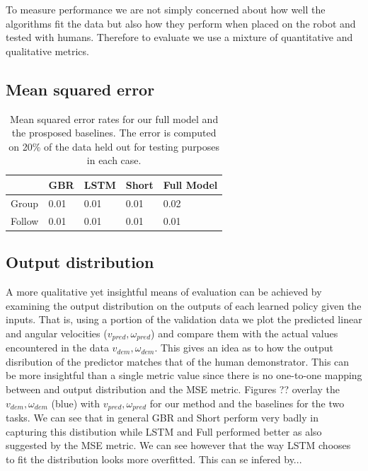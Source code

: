 \documentclass[letterpaper, 10 pt, conference]{ieeeconf}
\begin{document}
To measure performance we are not simply concerned about how well the algorithms fit the data but also how they perform when placed on the robot and tested with humans. Therefore to evaluate we use a mixture of quantitative and qualitative metrics. 

\subsection{Mean squared error}

\begin{table}[]
\centering
\caption{Mean squared error rates for our full model and the prosposed baselines. The error is computed on 20\% of the data held out for testing purposes in each case.} \label{tab:}
\label{my-label}
\begin{tabular}{|l|l|l|l|l|}
\hline
       & GBR  & LSTM & Short & Full Model \\ \hline
Group  & 0.01 & 0.01 & 0.01  & 0.02       \\ \hline
Follow & 0.01 & 0.01 & 0.01  & 0.01       \\ \hline
\end{tabular}

\end{table}



\subsection{Output distribution}
A more qualitative yet insightful means of evaluation can be achieved by examining the output distribution on the outputs of each learned policy given the inputs. That is, using a portion of the validation data we plot the predicted linear and angular velocities ($v_{pred},\omega_{pred}$) and compare them with the actual values encountered in the data $v_{dem},\omega_{dem}$. This gives an idea as to how the output disribution of the predictor matches that of the human demonstrator. This can be more insightful than a single metric value since there is no one-to-one mapping between and output distribution and the MSE metric. Figures ?? overlay the $v_{dem},\omega_{dem}$ (blue) with $v_{pred},\omega_{pred}$ for our method and the baselines for the two tasks. We can see that in general GBR and Short perform very badly in capturing this distibution while LSTM and Full performed better as also suggested by the MSE metric. We can see however that the way LSTM chooses to fit the distribution looks more overfitted. This can se infered by...
\end{document}
